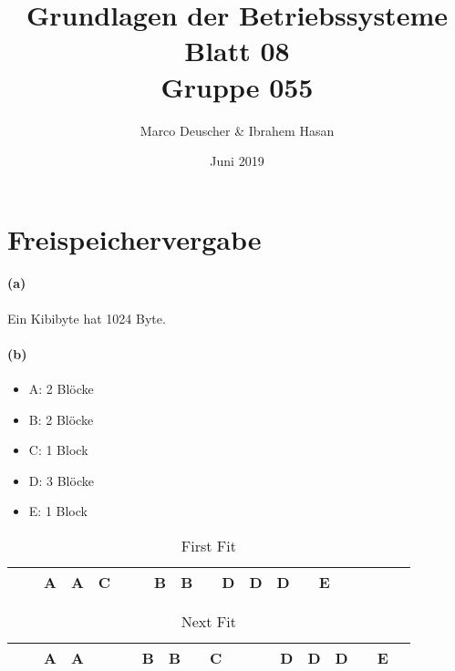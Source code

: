 \documentclass[a4paper]{article}
\title{Grundlagen der Betriebssysteme\\ Blatt 08 \\ Gruppe 055}
\author{Marco Deuscher & Ibrahem Hasan}
\date{Juni 2019}
\begin{document}
\maketitle

\section{Freispeichervergabe}
\paragraph{(a)}
Ein Kibibyte hat 1024 Byte.
\paragraph{(b)}
\begin{itemize}
    \item A: 2 Blöcke
    \item B: 2 Blöcke
    \item C: 1 Block
    \item D: 3 Blöcke
    \item E: 1 Block
\end{itemize}


\begin{table}[h]
    \centering
    \begin{tabular}{|c|c|c|c|c|c|c|c|c|c|c|c|c|c|c|c|c|c|c|c|}
    \toprule
          \cellcolor{gray} &
          \cellcolor{gray} &
          A&
          A&
          C&
          \cellcolor{gray}&
          \cellcolor{gray}&
          B&
          B&
          \cellcolor{gray}&
          D&
          D&
          D&
          \cellcolor{gray}&
          E&
          &
          &
          \cellcolor{gray}&
          &  
          \cellcolor{gray}\\
          \bottomrule
    \end{tabular}
    \caption{First Fit}
    \label{tab:my_label}
\end{table}

\begin{table}[h]
    \centering
    \begin{tabular}{|c|c|c|c|c|c|c|c|c|c|c|c|c|c|c|c|c|c|c|c|}
    \toprule
          \cellcolor{gray} &
          \cellcolor{gray} &
          A&
          A&
          &
          \cellcolor{gray}&
          \cellcolor{gray}&
          B&
          B&
          \cellcolor{gray}&
          C&
          &
          &
          \cellcolor{gray}&
          D&
          D&
          D&
          \cellcolor{gray}&
          E&  
          \cellcolor{gray}\\
          \bottomrule
    \end{tabular}
    \caption{Next Fit}
    \label{tab:my_label}
\end{table}
\end{document}
